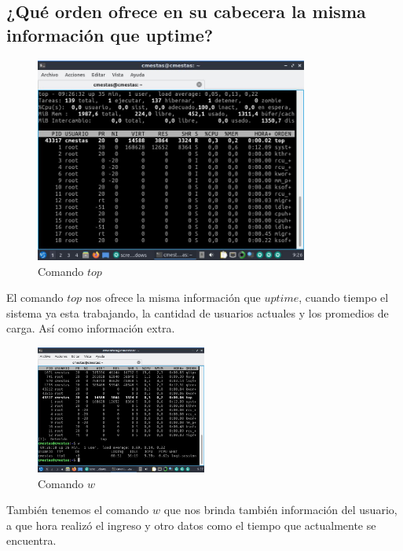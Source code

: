 \documentclass[12pt]{article}
\begin{document}
\clearpage
\newpage

\subsection{¿Qué orden ofrece en su cabecera la misma información que uptime?}

\begin{figure}[h]
    \centering
    \includegraphics[width=0.8\textwidth]{images/screenA03.jpg}
    \caption{Comando $top$}
\end{figure}

El comando $top$ nos ofrece la misma información que $uptime$, cuando tiempo el sistema ya esta trabajando, la cantidad de usuarios actuales y los promedios de carga. Así como información extra.

\begin{figure}[h]
    \centering
    \includegraphics[width=0.5\textwidth]{images/screenA04.jpg}
    \caption{Comando $w$}
\end{figure}

También tenemos el comando $w$ que nos brinda también información del usuario, a que hora realizó el ingreso y otro datos como el tiempo que actualmente se encuentra.

\clearpage
\newpage
\end{document}

